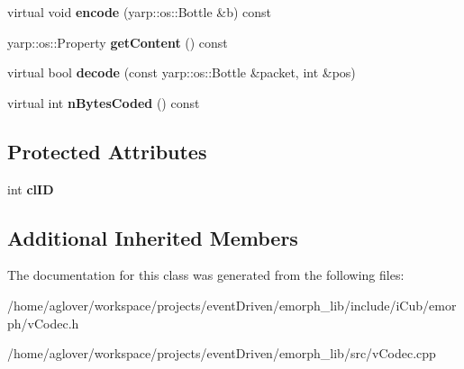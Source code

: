 \begin{DoxyCompactItemize}
\item 
\hypertarget{classemorph_1_1AddressEventClustered_ae818cd56d2c40e94f47df51890f24fb7}{virtual void {\bfseries encode} (yarp\-::os\-::\-Bottle \&b) const }\label{classemorph_1_1AddressEventClustered_ae818cd56d2c40e94f47df51890f24fb7}

\item 
\hypertarget{classemorph_1_1AddressEventClustered_ab1727071825261bfd230c224ce083433}{yarp\-::os\-::\-Property {\bfseries get\-Content} () const }\label{classemorph_1_1AddressEventClustered_ab1727071825261bfd230c224ce083433}

\item 
\hypertarget{classemorph_1_1AddressEventClustered_a84755ba69f9e2c4b5dcfc847fab04d88}{virtual bool {\bfseries decode} (const yarp\-::os\-::\-Bottle \&packet, int \&pos)}\label{classemorph_1_1AddressEventClustered_a84755ba69f9e2c4b5dcfc847fab04d88}

\item 
\hypertarget{classemorph_1_1AddressEventClustered_a02b5c1553f0b70fbf3207bc3924f626b}{virtual int {\bfseries n\-Bytes\-Coded} () const }\label{classemorph_1_1AddressEventClustered_a02b5c1553f0b70fbf3207bc3924f626b}

\end{DoxyCompactItemize}
\subsection*{Protected Attributes}
\begin{DoxyCompactItemize}
\item 
\hypertarget{classemorph_1_1AddressEventClustered_a9a4298a0e0e0390650289179cb52c24b}{int {\bfseries cl\-I\-D}}\label{classemorph_1_1AddressEventClustered_a9a4298a0e0e0390650289179cb52c24b}

\end{DoxyCompactItemize}
\subsection*{Additional Inherited Members}


The documentation for this class was generated from the following files\-:\begin{DoxyCompactItemize}
\item 
/home/aglover/workspace/projects/event\-Driven/emorph\-\_\-lib/include/i\-Cub/emorph/v\-Codec.\-h\item 
/home/aglover/workspace/projects/event\-Driven/emorph\-\_\-lib/src/v\-Codec.\-cpp\end{DoxyCompactItemize}

